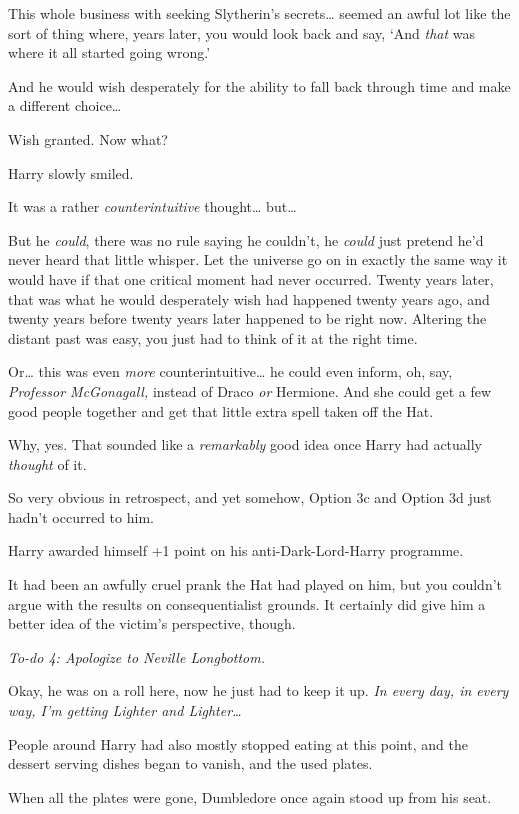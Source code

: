 This whole business with seeking Slytherin's secrets{\ldots} seemed an awful lot like the sort of thing where, years later, you would look back and say, `And \emph{that} was where it all started going wrong.'

And he would wish desperately for the ability to fall back through time and make a different choice{\ldots}

Wish granted. Now what?

Harry slowly smiled.

It was a rather \emph{counterintuitive} thought{\ldots} but{\ldots}

But he \emph{could}, there was no rule saying he couldn't, he \emph{could} just pretend he'd never heard that little whisper. Let the universe go on in exactly the same way it would have if that one critical moment had never occurred. Twenty years later, that was what he would desperately wish had happened twenty years ago, and twenty years before twenty years later happened to be right now. Altering the distant past was easy, you just had to think of it at the right time.

Or{\ldots} this was even \emph{more} counterintuitive{\ldots} he could even inform, oh, say, \emph{Professor McGonagall,} instead of Draco \emph{or} Hermione. And she could get a few good people together and get that little extra spell taken off the Hat.

Why, yes. That sounded like a \emph{remarkably} good idea once Harry had actually \emph{thought} of it.

So very obvious in retrospect, and yet somehow, Option 3c and Option 3d just hadn't occurred to him.

Harry awarded himself +1 point on his anti-Dark-Lord-Harry programme.

It had been an awfully cruel prank the Hat had played on him, but you couldn't argue with the results on consequentialist grounds. It certainly did give him a better idea of the victim's perspective, though.

\emph{To-do 4: Apologize to Neville Longbottom.}

Okay, he was on a roll here, now he just had to keep it up. \emph{In every day, in every way, I'm getting Lighter and Lighter{\ldots}}

People around Harry had also mostly stopped eating at this point, and the dessert serving dishes began to vanish, and the used plates.

When all the plates were gone, Dumbledore once again stood up from his seat.

